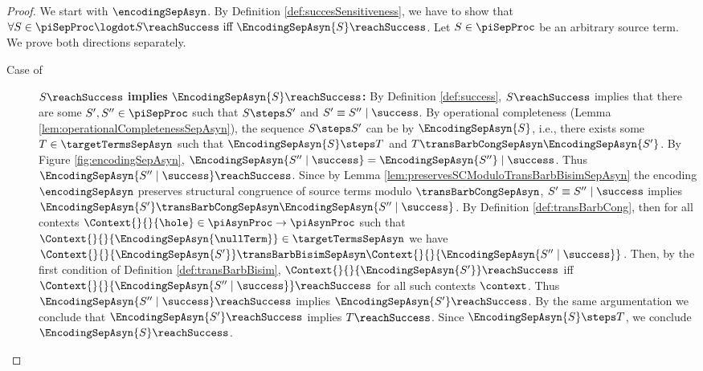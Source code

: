 \documentclass[]{llncs}
\begin{document}
\begin{proof}
	We start with $ \encodingSepAsyn $. By Definition \ref{def:succesSensitiveness}, we have to show that $ \forall S \in \piSepProc \logdot S\reachSuccess \text{ iff } \EncodingSepAsyn{S}\reachSuccess $. Let $ S \in \piSepProc $ be an arbitrary source term. We prove both directions separately.
	\begin{description}
		\item[Case of] $ S\reachSuccess $ \textbf{implies} $ \EncodingSepAsyn{S}\reachSuccess $\textbf{:} By Definition \ref{def:success}, $ S\reachSuccess $ implies that there are some $ S', S'' \in \piSepProc $ such that $ S \steps S' $ and $ S' \equiv S'' \mid \success $. By operational completeness (Lemma \ref{lem:operationalCompletenessSepAsyn}), the sequence $ S \steps S' $ can be \simulated by $ \EncodingSepAsyn{S} $, i.e., there exists some $ T \in \targetTermsSepAsyn $ such that $ \EncodingSepAsyn{S} \steps T $ and $ T \transBarbCongSepAsyn \EncodingSepAsyn{S'} $. By Figure \ref{fig:encodingSepAsyn}, $ \EncodingSepAsyn{S'' \mid \success} = \EncodingSepAsyn{S''} \mid \success $. Thus $ \EncodingSepAsyn{S'' \mid \success}\reachSuccess $. Since by Lemma \ref{lem:preservesSCModuloTransBarbBisimSepAsyn} the encoding $ \encodingSepAsyn $ preserves structural congruence of source terms modulo $ \transBarbCongSepAsyn $, $ S' \equiv S'' \mid \success $ implies $ \EncodingSepAsyn{S'} \transBarbCongSepAsyn \EncodingSepAsyn{S'' \mid \success} $. By Definition \ref{def:transBarbCong}, then for all contexts $ \Context{}{}{\hole} \in \piAsynProc \to \piAsynProc $ such that $ \Context{}{}{\EncodingSepAsyn{\nullTerm}} \in \targetTermsSepAsyn $ we have $ \Context{}{}{\EncodingSepAsyn{S'}} \transBarbBisimSepAsyn \Context{}{}{\EncodingSepAsyn{S'' \mid \success}} $. Then, by the first condition of Definition \ref{def:transBarbBisim}, $ \Context{}{}{\EncodingSepAsyn{S'}}\reachSuccess $ iff $ \Context{}{}{\EncodingSepAsyn{S'' \mid \success}}\reachSuccess $ for all such contexts $ \context $. Thus $ \EncodingSepAsyn{S'' \mid \success}\reachSuccess $ implies $ \EncodingSepAsyn{S'}\reachSuccess $. By the same argumentation we conclude that $ \EncodingSepAsyn{S'}\reachSuccess $ implies $ T\reachSuccess $. Since $ \EncodingSepAsyn{S} \steps T $, we conclude $ \EncodingSepAsyn{S}\reachSuccess $.

\end{description}
\end{proof}
\end{document}
